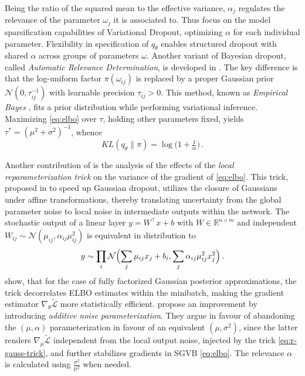 \documentclass[a4paper,10pt]{article}
\begin{document}
Being the ratio of the squared mean to the effective variance, $\alpha_j$ regulates the
relevance of the parameter $\omega_j$ it is associated to. Thus \citet{molchanov_variational_2017}
focus on the model sparsification capabilities of Variational Dropout, optimizing $\alpha$
for each individual parameter. Flexibility in specification of $q_\theta$ enables structured
dropout with shared $\alpha$ across groups of parameters $\omega$. Another variant of Bayesian
dropout, called \textit{Automatic Relevance Determination}, is developed in \citep{kharitonov_variational_2018}.
The key difference is that the log-uniform factor $\pi(\omega_{ij})$ is replaced by a proper
Gaussian prior $
  \mathcal{N}(0, \tau^{-1}_{ij})
$ with learnable precision $\tau_{ij} > 0$. This method, known as \textit{Empirical Bayes}
\citep{citation_needed}, fits a prior distribution while performing variational inference.
Maximizing \eqref{eq:elbo} over $\tau$, holding other parameters fixed, yields $
  \tau^* = {(\mu^2 + \sigma^2)}^{-1}
$, whence
\begin{equation}  \label{eq:ard-kl-div-real}
  KL(q_\theta \| \pi)
    = \log{\bigl(1 + \tfrac1{\alpha} \bigr)}
    \,.
\end{equation}

Another contribution of \citep{kingma_variational_2015} is the analysis of the effects of the
\textit{local reparameterization trick} on the variance of the gradient of \eqref{eq:elbo}.
This trick, proposed in \citep{wang_fast_2013} to speed up Gaussian dropout, utilizes the
closure of Gaussians under affine transformations, thereby translating uncertainty from the
global parameter noise to local noise in intermediate outputs within the network.
%
The stochastic output of a linear layer $
  y = W^\top x + b
$ with $
  W \in \mathbb{R}^{n\times m}
$ and independent $
  W_{ij} \sim \mathcal{N}(\mu_{ij}, \alpha_{ij} \mu_{ij}^2)
$ is equivalent in distribution to
\begin{equation}  \label{eq:r-gauss-trick}
    y \sim \prod_i \mathcal{N}\Bigl(
          \sum_j \mu_{ij} x_j + b_i,
          \sum_j \alpha_{ij} \mu_{ij}^2 x_j^2
      \Bigr)
    \,.
\end{equation}
%
\citet{kingma_variational_2015} show, that for the case of fully factorized Gaussian
posterior approximations, the trick decorrelates ELBO estimates within the minibatch,
making the gradient estimator $\nabla_\theta \tilde{\mathcal{L}}$ more statistically
efficient. \citet{molchanov_variational_2017} propose an improvement by introducing
\textit{additive noise parameterization}. They argue in favour of abandoning the
$(\mu, \alpha)$ parameterization in favour of an equivalent $(\mu, \sigma^2)$, since
the latter renders $
  \nabla_\mu \tilde{\mathcal{L}}
$ independent from the local output noise, injected by the trick \eqref{eq:r-gauss-trick},
and further stabilizes gradients in SGVB \eqref{eq:elbo}. The relevance $\alpha$ is
calculated using $
  \tfrac{\sigma^2}{\mu^2}
$ when needed.
\end{document}
